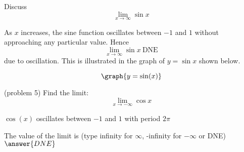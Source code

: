\documentclass[handout]{ximera}
\begin{document}
\begin{example}[example 5]
Discuss
\[
\lim_{x\to \infty} \sin x
\]

As $x$ increases, the sine function oscillates between $-1$ and $1$ without approaching any particular value.
Hence
\[
\lim_{x\to \infty} \sin x \ \text{DNE}
\]
due to oscillation.
This is illustrated in the graph of $y=\sin x$ shown below.

\[
\graph{y=\sin(x)}
\]

\end{example}

\begin{problem}(problem 5)
Find the limit:
\[
 \lim_{x \to -\infty} \cos x
\]

\begin{hint}
$\cos(x)$ oscillates between $-1$ and $1$ with period $2\pi$
\end{hint}

The value of the limit is
		(type infinity for $\infty$, -infinity for $-\infty$ or DNE)
		 $\answer{DNE}$
\end{problem}

\begin{center}
\begin{foldable}
\end{foldable}
\end{center}
\end{document}
